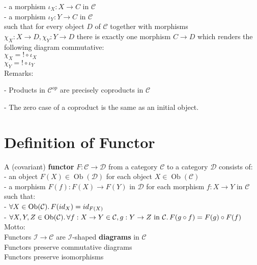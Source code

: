 \documentclass[a4paper, twoside, english, 11pt]{book}
\DeclareMathOperator{\Ob}{Ob}
\newcommand{\C}{\mathcal C}
\newcommand{\D}{\mathcal D}
\newcommand{\I}{\mathcal I}
\begin{document}
- a morphism $\iota_X : X \rightarrow C$ in $\C$ \\

- a morphism $\iota_Y : Y \rightarrow C$ in $\C$ \\

\noindent
such that for every object $D$ of $\C$ together with morphisms $\chi_X : X \rightarrow D, \chi_Y : Y \rightarrow D$ there is exactly one morphism $C \rightarrow D$ which renders the following diagram commutative: \\

$\chi_X = ! \circ \iota_X$ \\
\indent
$\chi_Y = ! \circ  \iota_Y$ \\

\noindent
Remarks:

- Products in $\C^{op}$ are precisely coproducts in $\C$

- The zero case of a coproduct is the same as an initial object.



\section{Definition of Functor}

A (covariant) \textbf{functor} $F : \C \rightarrow \D$ from a category $\C$ to a category $\D$ consists of: \\

- an object $F(X) \in \Ob(\D)$ for each object $X \in \Ob(\C)$ \\

- a morphism $F(f) : F(X) \rightarrow F(Y)$ in $\D$ for each morphism $f : X \rightarrow Y$ in $\C$ \\

\noindent
such that: \\

- $\forall X \in \Ob(\C) \ldotp F(id_X) = id_{F(X)}$ \\

- $\forall X, Y, Z \in \Ob(\C) \ldotp \forall f : X \rightarrow Y \in \C, g : Y \rightarrow Z \text{ in } \C \ldotp F(g \circ f) = F(g) \circ F(f)$ \\

\noindent
Motto: \\
Functors $\I \rightarrow \C$ are $\I$-shaped \textbf{diagrams} in $\C$ \\

\noindent
Functors preserve commutative diagrams \\
Functors preserve isomorphisms
\end{document}
